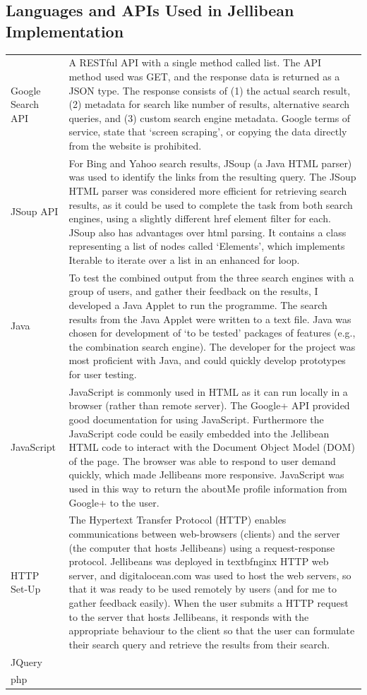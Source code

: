 \documentclass[a4paper, 11pt]{article}
\begin{document}
\newpage

\subsection{Languages and APIs Used in Jellibean Implementation}\label{implementation}

\begin{tabular}{l p{11cm} }
Google Search API & A RESTful API with a single method called list. The API method used was GET, and the response data is returned as a JSON type. The response consists of (1) the actual search result, (2) metadata for search like number of results, alternative search queries, and (3) custom search engine metadata. Google terms of service, state that `screen scraping', or copying the data directly from the website is prohibited.\\
JSoup API & For Bing and Yahoo search results, JSoup (a Java HTML parser) was used to identify the links from the resulting query. The JSoup HTML parser was considered more efficient for retrieving search results, as it could be used to complete the task from both search engines, using a slightly different href element filter for each. JSoup also has advantages over html parsing. It contains a class representing a list of nodes called `Elements', which implements Iterable to iterate over a list in an enhanced for loop.\\
Java & To test the combined output from the three search engines with a group of users, and gather their feedback on the results, I developed a Java Applet to run the programme. The search results from the Java Applet were written to a text file. Java was chosen for development of `to be tested' packages of features (e.g., the combination search engine). The developer for the project was most proficient with Java, and could quickly develop prototypes for user testing.\\
JavaScript & JavaScript is commonly used in HTML as it can run locally in a browser (rather than remote server). The Google+ API provided good documentation for using JavaScript. Furthermore the JavaScript code could be easily embedded into the Jellibean HTML code to interact with the Document Object Model (DOM) of the page. The browser was able to respond to user demand quickly, which made Jellibeans more responsive. JavaScript was used in this way to return the aboutMe profile information from Google+ to the user.\\
HTTP Set-Up & The Hypertext Transfer Protocol (HTTP) enables communications between web-browsers (clients) and the server (the computer that hosts Jellibeans) using a request-response protocol. Jellibeans was deployed in textbf{nginx} HTTP web server, and digitalocean.com was used to host the web servers, so that it was ready to be used remotely by users (and for me to gather feedback easily). When the user submits a HTTP request to the server that hosts Jellibeans, it responds with the appropriate behaviour to the client so that the user can formulate their search query and retrieve the results from their search. \\
JQuery & \\
php & \\


\end{tabular}
\end{document}
